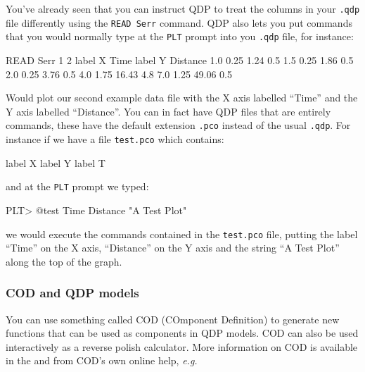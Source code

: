 \documentclass[twoside,11pt]{starlink}
\begin{document}
You've already seen that you can instruct QDP to treat the columns in
your \texttt{.qdp} file differently using the \texttt{READ Serr} command.
QDP also lets you put commands that you would normally type at the
\texttt{PLT} prompt into you \texttt{.qdp} file, for instance:

\begin{small}
\begin{terminalv}
READ Serr 1 2
label X Time
label Y Distance
1.0  0.25  1.24  0.5
1.5  0.25  1.86  0.5
2.0  0.25  3.76  0.5
4.0  1.75 16.43  4.8
7.0  1.25 49.06  0.5
\end{terminalv}
\end{small}

Would plot our second example data file with the X axis labelled
``Time'' and the Y axis labelled ``Distance''. You can in fact have
QDP files that are entirely commands, these have the default extension
\texttt{.pco} instead of the usual \texttt{.qdp}. For instance if we have a
file \texttt{test.pco} which contains:

\begin{small}
\begin{terminalv}
label X %
label Y %
label T %
\end{terminalv}
\end{small}

and at the \texttt{PLT} prompt we typed:

\begin{small}
\begin{terminalv}
PLT> @test Time Distance "A Test Plot"
\end{terminalv}
\end{small}

we would execute the commands contained in the \texttt{test.pco} file,
putting the label ``Time'' on the X axis, ``Distance'' on the Y axis
and the string ``A Test Plot'' along the top of the graph.

\subsubsection{COD and QDP models}

You can use something called COD (COmponent Definition) to generate
new functions that can be used as components in QDP models. COD can
also be used interactively as a reverse polish calculator. More
information on COD is available in the 
and from COD's own online help, \emph{e.g.\ }
\end{document}

